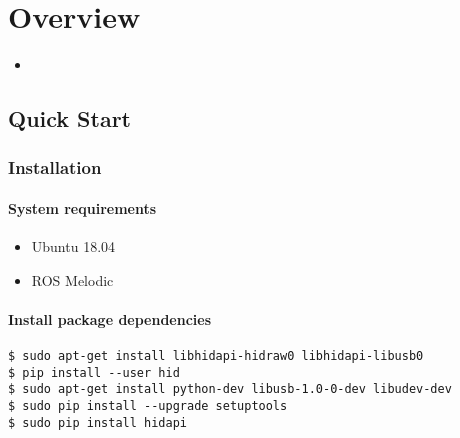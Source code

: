 \documentclass[letterpaper,10pt,english]{sphinxmanual}
\begin{document}
\chapter{Overview}
\label{\detokenize{index:overview}}\begin{itemize}
\item {} 
\sphinxAtStartPar
{\hyperref[\detokenize{user_guide/1_1_introduction::doc}]{}}

\end{itemize}

\sphinxstepscope


\section{Quick Start}
\label{\detokenize{user_guide/1_1_introduction:quick-start}}\label{\detokenize{user_guide/1_1_introduction::doc}}

\subsection{Installation}
\label{\detokenize{user_guide/1_1_introduction:installation}}

\subsubsection{System requirements}
\label{\detokenize{user_guide/1_1_introduction:system-requirements}}\begin{itemize}
\item {} 
\sphinxAtStartPar
Ubuntu 18.04

\item {} 
\sphinxAtStartPar
ROS Melodic

\end{itemize}


\subsubsection{Install package dependencies}
\label{\detokenize{user_guide/1_1_introduction:install-package-dependencies}}


\begin{Verbatim}[commandchars=\\\{\}]
$ sudo apt-get install libhidapi-hidraw0 libhidapi-libusb0
$ pip install --user hid
$ sudo apt-get install python-dev libusb-1.0-0-dev libudev-dev
$ sudo pip install --upgrade setuptools
$ sudo pip install hidapi
\end{Verbatim}
\end{document}
